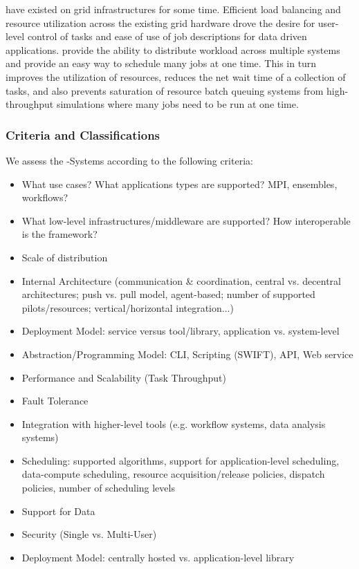 \documentclass{sig-alternate}
\begin{document}
\pilotjobs have existed on grid infrastructures for some time. 
Efficient load balancing and resource utilization
across the existing grid hardware drove the desire for 
user-level control of tasks and ease of use of job descriptions for
data driven applications.  \pilotjobs provide the ability to 
distribute workload across multiple systems and
provide an easy way to schedule many jobs at one time. This in turn
improves the utilization of resources, reduces the net wait time of a
collection of tasks, and also prevents saturation of resource batch
queuing systems from high-throughput simulations where many jobs
need to be run at one time.

\subsubsection*{Criteria and Classifications}

We assess the \pilotjob-Systems according to the following criteria:
\begin{itemize}
	\item What use cases? What applications types are supported? MPI, ensembles, workflows?
	\item What low-level infrastructures/middleware are supported? How interoperable is the framework?
	\item Scale of distribution
	\item Internal Architecture (communication \& coordination, central vs. decentral architectures; push vs. pull model, agent-based; number of supported pilots/resources; vertical/horizontal integration...)
	\item Deployment Model: service versus tool/library, application vs. system-level
    \item Abstraction/Programming Model: CLI, Scripting (SWIFT), API, Web service
	\item Performance and Scalability (Task Throughput)
	\item Fault Tolerance
	\item Integration with higher-level tools (e.g. workflow systems, data analysis systems)
	\item Scheduling: supported algorithms, support for application-level 
	scheduling, data-compute scheduling, resource acquisition/release policies, dispatch policies, number of scheduling levels
	\item Support for Data
	\item Security (Single vs. Multi-User)
	\item Deployment Model: centrally hosted vs. application-level library
\end{itemize}
\end{document}
